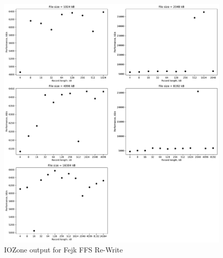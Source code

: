 \begin{figure}[!htb]
	\label{fig:app_bench_fffs_re_write}
	\begin{center}
		\includegraphics[width=1.0\textwidth]{figures/benchmarking/fake-ffs/Re-Write.pdf}
	\end{center}
	\caption{IOZone output for Fejk FFS Re-Write}
\end{figure}

